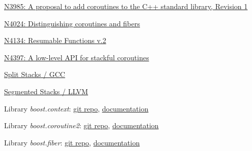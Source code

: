 \begin{thebibliography}{99}

        \href{http://www.open-std.org/jtc1/sc22/wg21/docs/papers/2014/n3985.pdf}
        {N3985: A proposal to add coroutines to the C++ standard library, Revision 1}

        \href{http://www.open-std.org/jtc1/sc22/wg21/docs/papers/2014/n4024.pdf}
        {N4024: Distinguishing coroutines and fibers}

        \href{http://www.open-std.org/jtc1/sc22/wg21/docs/papers/2014/n4134.pdf}
        {N4134: Resumable Functions v.2}

        \href{http://www.open-std.org/jtc1/sc22/wg21/docs/papers/2015/n4397.pdf}
        {N4397: A low-level API for stackful coroutines}

        \href{http://gcc.gnu.org/wiki/SplitStacks}
        {Split Stacks / GCC}

        \href{http://llvm.org/releases/3.0/docs/SegmentedStacks.html}
        {Segmented Stacks / LLVM}

        Library \emph{boost.context}:
        \href{https://github.com/boostorg/context} {git repo},
        \href{http://www.boost.org/doc/libs/1_58_0/libs/context/doc/html/index.html} {documentation}

        Library \emph{boost.coroutine2}:
        \href{https://github.com/boostorg/coroutine2} {git repo},
        \href{http://olk.github.io/libs/coroutine2/doc/html/index.html} {documentation}

        Library \emph{boost.fiber}:
        \href{https://github.com/olk/boost-fiber} {git repo},
        \href{http://olk.github.io/libs/fiber/doc/html/index.html} {documentation}

\end{thebibliography}
